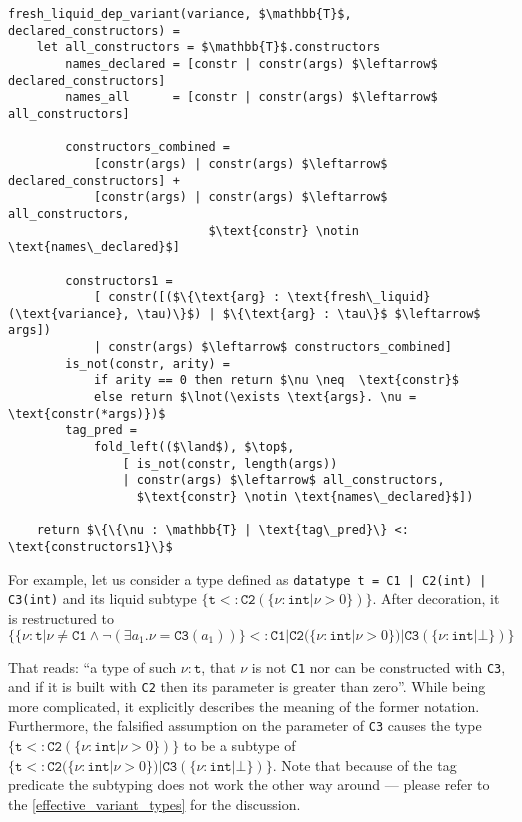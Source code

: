 \begin{minipage}{\linewidth}
\begin{lstlisting}[language=pseudocode]
fresh_liquid_dep_variant(variance, $\mathbb{T}$, declared_constructors) =
    let all_constructors = $\mathbb{T}$.constructors
        names_declared = [constr | constr(args) $\leftarrow$ declared_constructors]
        names_all      = [constr | constr(args) $\leftarrow$ all_constructors]

        constructors_combined =
            [constr(args) | constr(args) $\leftarrow$ declared_constructors] +
            [constr(args) | constr(args) $\leftarrow$ all_constructors,
                            $\text{constr} \notin \text{names\_declared}$]

        constructors1 =
            [ constr([($\{\text{arg} : \text{fresh\_liquid}(\text{variance}, \tau)\}$) | $\{\text{arg} : \tau\}$ $\leftarrow$ args])
            | constr(args) $\leftarrow$ constructors_combined]
        is_not(constr, arity) =
            if arity == 0 then return $\nu \neq  \text{constr}$
            else return $\lnot(\exists \text{args}. \nu = \text{constr(*args)})$
        tag_pred =
            fold_left(($\land$), $\top$,
                [ is_not(constr, length(args))
                | constr(args) $\leftarrow$ all_constructors,
                  $\text{constr} \notin \text{names\_declared}$])

    return $\{\{\nu : \mathbb{T} | \text{tag\_pred}\} <: \text{constructors1}\}$
\end{lstlisting}
\end{minipage}

For example, let us consider a type defined as \texttt{datatype t = C1 | C2(int)
  | C3(int)} and its liquid subtype $\{\texttt{t} <: \texttt{C2}(\{\nu :
\texttt{int} | \nu > 0\})\}$. After decoration, it is restructured to
$$\{\{\nu : \texttt{t} | \nu \neq \texttt{C1} \land \lnot(\exists a_1. \nu =
\texttt{C3}(a_1))\} <: \texttt{C1} | \texttt{C2}(\{\nu : \texttt{int} | \nu >
0\}) | \texttt{C3}(\{\nu : \texttt{int} | \bot\})\}$$

That reads: ``a type of such $\nu : \texttt{t}$, that $\nu$ is not \texttt{C1}
nor can be constructed with \texttt{C3}, and if it is built with \texttt{C2}
then its parameter is greater than zero''. While being more complicated, it
explicitly describes the meaning of the former notation. Furthermore, the
falsified assumption on the parameter of \texttt{C3} causes the type
$\{\texttt{t} <: \texttt{C2}(\{\nu : \texttt{int} | \nu > 0\})\}$ to be a
subtype of $\{\texttt{t} <: \texttt{C2}(\{\nu : \texttt{int} | \nu > 0\}) |
\texttt{C3}(\{\nu : \texttt{int} | \bot\})\}$. Note that because of the tag
predicate the subtyping does not work the other way around --- please refer to
the \autoref{effective_variant_types} for the discussion.

